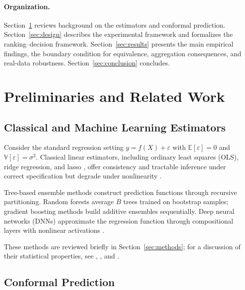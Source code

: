 \documentclass[a4paper,11pt]{article}
\begin{document}
\paragraph{Organization.}
Section~\ref{sec:prelim} reviews background on the estimators and conformal prediction. Section~\ref{sec:design} describes the experimental framework and formalizes the ranking--decision framework. Section~\ref{sec:results} presents the main empirical findings, the boundary condition for equivalence, aggregation consequences, and real-data robustness. Section~\ref{sec:conclusion} concludes.

\section{Preliminaries and Related Work}
\label{sec:prelim}

\subsection{Classical and Machine Learning Estimators}

Consider the standard regression setting $y = f(X) + \varepsilon$ with $\mathbb{E}[\varepsilon] = 0$ and $\mathbb{V}[\varepsilon] = \sigma^2$. Classical linear estimators, including ordinary least squares (OLS), ridge regression, and lasso \citep{tibshirani1996}, offer consistency and tractable inference under correct specification but degrade under nonlinearity \citep{lehmann2006}.

Tree-based ensemble methods construct prediction functions through recursive partitioning. Random forests \citep[RF;][]{breiman2001} average $B$ trees trained on bootstrap samples; gradient boosting methods \citep{chen2016, ke2017} build additive ensembles sequentially. Deep neural networks (DNNs) approximate the regression function through compositional layers with nonlinear activations \citep{goodfellow2016}.

These methods are reviewed briefly in Section~\ref{sec:methods}; for a discussion of their statistical properties, see \citet{scornet2015}, \citet{mentch2016}, and \citet{farrell2021}.

\subsection{Conformal Prediction}
\end{document}
